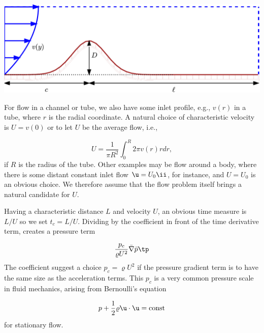 \documentclass[graybox,envcountchap,sectrefs,final]{svmonodo}
\begin{document}
\vspace{3mm}




\vspace{3mm}





\centerline{\includegraphics[width=0.9\linewidth]{fig-scaling/flow_over_gaussian.pdf}}





\vspace{3mm}




\vspace{3mm}



For flow in a channel or tube, we also have some inlet profile, e.g.,
$v(r)$ in a tube, where $r$ is the radial coordinate. A natural
choice of characteristic velocity is $U=v(0)$ or to let $U$ be
the average flow, i.e.,

\[ U = \frac{1}{\pi R^2}\int_0^R 2\pi v(r)rdr,\]
if $R$ is the radius of the tube. Other examples may be flow around
a body, where there is some distant constant inlet flow $\u = U_0\ii$,
for instance, and $U=U_0$ is an obvious choice. We therefore
assume that the flow problem itself brings a natural candidate for $U$.

Having a characteristic distance $L$ and velocity $U$, an obvious
time measure is $L/U$ so we set $t_c=L/U$. Dividing by the
coefficient in front of the time derivative term, creates a pressure
term

\[ \frac{p_c}{\varrho U^2}\bar\nabla\bar p\tp\]
The coefficient suggest a choice $p_c=\varrho U^2$ if the pressure
gradient term is to have the same size as the acceleration terms.
This $p_c$ is a very common pressure scale in fluid mechanics,
arising from Bernoulli's equation


\[ p + \frac{1}{2}\varrho \u\cdot\u =
\hbox{const}\]
for stationary flow.
\end{document}
